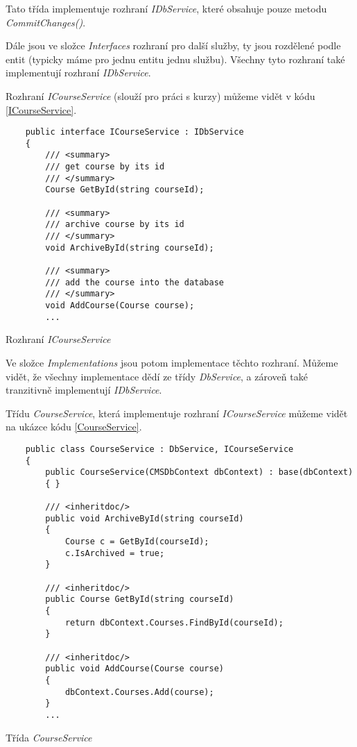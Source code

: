 Tato třída implementuje rozhraní \textit{IDbService}, které obsahuje pouze metodu \textit{CommitChanges()}.

Dále jsou ve složce \textit{Interfaces} rozhraní pro další služby, ty jsou rozdělené podle entit (typicky máme pro jednu entitu jednu službu). Všechny tyto rozhraní také implementují rozhraní \textit{IDbService}. 

Rozhraní \textit{ICourseService} (slouží pro práci s kurzy) můžeme vidět v kódu \ref{ICourseService}.
\begin{program}
	\begin{lstlisting}
	public interface ICourseService : IDbService
	{
		/// <summary>
		/// get course by its id
		/// </summary>
		Course GetById(string courseId);
		
		/// <summary>
		/// archive course by its id
		/// </summary>
		void ArchiveById(string courseId);
		
		/// <summary>
		/// add the course into the database
		/// </summary>
		void AddCourse(Course course);
		...
	\end{lstlisting}
	\caption{Rozhraní \textit{ICourseService}}
	\label{ICourseService}
\end{program}

Ve složce \textit{Implementations} jsou potom implementace těchto rozhraní. Můžeme vidět, že všechny implementace dědí ze třídy \textit{DbService}, a zároveň také tranzitivně implementují \textit{IDbService}.

Třídu \textit{CourseService}, která implementuje rozhraní \textit{ICourseService} můžeme vidět na ukázce kódu \ref{CourseService}.

\begin{program}
	\begin{lstlisting}
	public class CourseService : DbService, ICourseService
	{
		public CourseService(CMSDbContext dbContext) : base(dbContext)
		{ }
		
		/// <inheritdoc/>
		public void ArchiveById(string courseId)
		{
			Course c = GetById(courseId);
			c.IsArchived = true;
		}
		
		/// <inheritdoc/>
		public Course GetById(string courseId)
		{
			return dbContext.Courses.FindById(courseId);
		}
		
		/// <inheritdoc/>
		public void AddCourse(Course course)
		{
			dbContext.Courses.Add(course);
		}
		...
	\end{lstlisting}
	\caption{Třída \textit{CourseService}}
	\label{CourseService}
\end{program}

